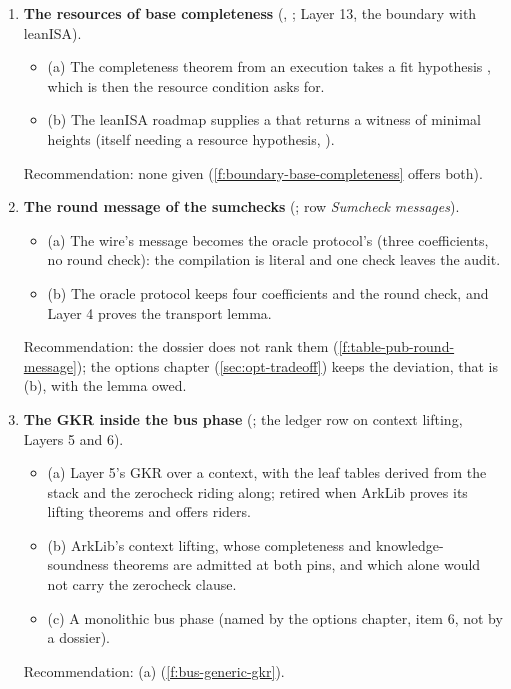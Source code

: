 \begin{enumerate}[leftmargin=*, itemsep=6pt]
\item \textbf{The resources of base completeness} (, ; Layer 13, the
  boundary with leanISA).
  \begin{itemize}[label={}, leftmargin=1.2em]
  \item (a) The completeness theorem from an execution takes a fit hypothesis , which is
    then the resource condition  asks for.
  \item (b) The leanISA roadmap supplies a  that returns a witness of
    minimal heights (itself needing a resource hypothesis, ).
  \end{itemize}
  Recommendation: none given (\cref{f:boundary-base-completeness} offers both).

\item \textbf{The round message of the sumchecks} (; row \emph{Sumcheck messages}).
  \begin{itemize}[label={}, leftmargin=1.2em]
  \item (a) The wire's message becomes the oracle protocol's (three coefficients, no round
    check): the compilation is literal and one check leaves the audit.
  \item (b) The oracle protocol keeps four coefficients and the round check, and Layer 4 proves
    the transport lemma.
  \end{itemize}
  Recommendation: the dossier does not rank them (\cref{f:table-pub-round-message}); the options
  chapter (\cref{sec:opt-tradeoff}) keeps the deviation, that is (b), with the lemma owed.

\item \textbf{The GKR inside the bus phase} (; the ledger row on context lifting,
  Layers 5 and 6).
  \begin{itemize}[label={}, leftmargin=1.2em]
  \item (a) Layer 5's GKR over a context, with the leaf tables derived from the stack and the
    zerocheck riding along; retired when ArkLib proves its lifting theorems and offers riders.
  \item (b) ArkLib's context lifting, whose completeness and knowledge-soundness theorems are
    admitted at both pins, and which alone would not carry the zerocheck clause.
  \item (c) A monolithic bus phase (named by the options chapter, item 6, not by a dossier).
  \end{itemize}
  Recommendation: (a) (\cref{f:bus-generic-gkr}).


\end{enumerate}
